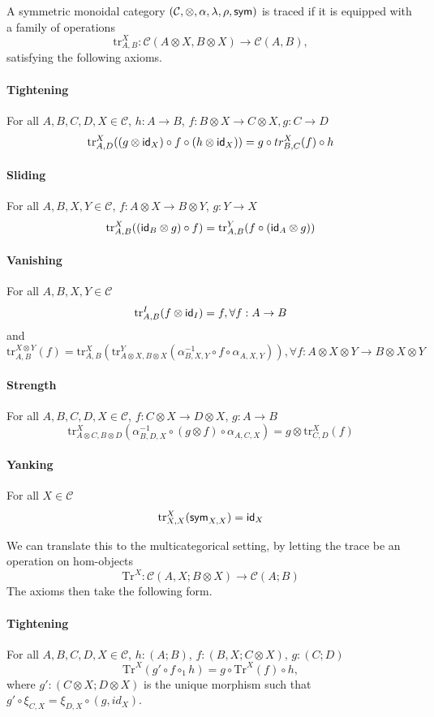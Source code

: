 \begin{definition}
  A symmetric monoidal category $(\mathcal{C}, \otimes, \alpha, \lambda, \rho, \textsf{sym})$ is traced if it is equipped with a family of operations 
  \[
  \text{tr}_{A,B}^{X} : \mathcal{C}(A \otimes X, B \otimes X) \to \mathcal{C}(A,B),
  \]
  satisfying the following axioms.
  \paragraph{Tightening} For all $A,B,C,D,X \in \mathcal{C}$, $h : A \to B$, $f : B \otimes X \to C \otimes X, g : C \to D$
\[
\text{tr}_{A,D}^{X}((g \otimes \textsf{id}_{X}) \circ f \circ (h \otimes \textsf{id}_{X})) = g \circ tr_{B,C}^{X}(f) \circ h
\]
\paragraph{Sliding} For all $A,B,X,Y \in \mathcal{C}$, $f : A \otimes X \to B \otimes Y$, $g : Y \to X$
\[
\text{tr}_{A,B}^{X}((\textsf{id}_{B} \otimes g) \circ f) = \text{tr}_{A,B}^{Y}(f \circ (\textsf{id}_{A} \otimes g))
\]
\paragraph{Vanishing} For all $A,B,X,Y \in \mathcal{C}$
\[
\text{tr}_{A,B}^{I}(f \otimes \textsf{id}_{I}) = f, \forall f : A \to B
\]
and
\[
\text{tr}_{A,B}^{X \otimes Y}(f) = \text{tr}_{A,B}^{X}(\text{tr}_{A \otimes X, B \otimes X}^{Y}(\alpha^{-1}_{B,X,Y} \circ f \circ \alpha_{A,X,Y})), \forall f : A \otimes X \otimes Y \to B \otimes X \otimes Y
\]
\paragraph{Strength} For all $A,B,C,D,X \in \mathcal{C}$, $f : C \otimes X \to D \otimes X$, $g : A \to B$
\[
\text{tr}_{A \otimes C,B \otimes D}^{X}(\alpha^{-1}_{B,D,X} \circ (g \otimes f) \circ \alpha_{A,C,X}) = g \otimes \text{tr}_{C,D}^{X}(f)
\]
\paragraph{Yanking} For all $X \in \mathcal{C}$
\[
\text{tr}_{X,X}^{X}(\textsf{sym}_{X,X}) = \textsf{id}_{X}
\]
\end{definition}

We can translate this to the multicategorical setting, by letting the trace be an operation on hom-objects
\[
\text{Tr}^{X} : \mathcal{C}(A,X; B \otimes X) \to \mathcal{C}(A; B)
\]
The axioms then take the following form.
\paragraph{Tightening} For all $A,B,C,D,X \in \mathcal{C}$, $h : (A;B)$, $f : (B,X; C \otimes X)$, $g : (C;D)$
\[
\text{Tr}^{X}(g' \circ f \circ_{1} h) = g \circ \text{Tr}^{X}(f) \circ h,
\]
where $g' : (C \otimes X; D \otimes X)$ is the unique morphism such that $g' \circ \xi_{C,X} = \xi_{D,X} \circ  (g, id_{X})$.
